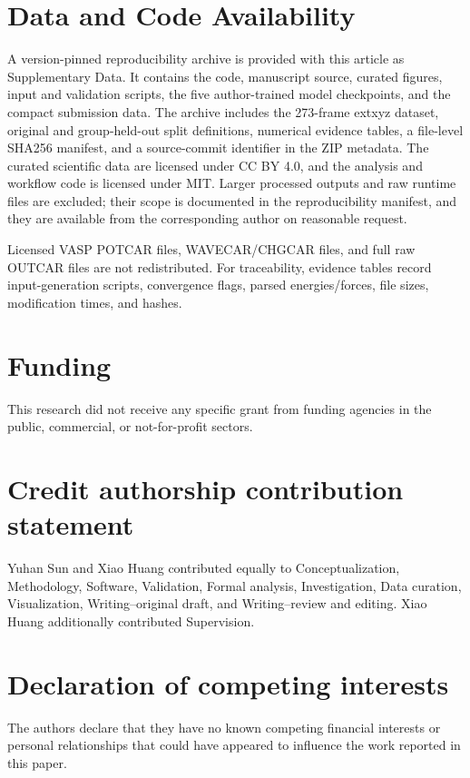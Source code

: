\documentclass[12pt]{article}
\begin{document}
\section*{Data and Code Availability}

A version-pinned reproducibility archive is provided with this article as
Supplementary Data. It contains the code, manuscript source, curated figures,
input and validation scripts, the five author-trained model checkpoints, and
the compact submission data. The archive includes the 273-frame extxyz dataset,
original and group-held-out split definitions, numerical evidence tables, a
file-level SHA256 manifest, and a source-commit identifier in the ZIP metadata.
The curated scientific data are licensed under CC BY 4.0, and the analysis and
workflow code is licensed under MIT. Larger processed outputs and raw runtime
files are excluded; their scope is documented in the reproducibility manifest,
and they are available from the corresponding author on reasonable request.

Licensed VASP POTCAR files, WAVECAR/CHGCAR files, and full raw OUTCAR files are not redistributed. For traceability, evidence tables record input-generation scripts, convergence flags, parsed energies/forces, file sizes, modification times, and hashes.

\section*{Funding}

This research did not receive any specific grant from funding agencies in the public, commercial, or not-for-profit sectors.

\section*{Credit authorship contribution statement}

Yuhan Sun and Xiao Huang contributed equally to Conceptualization, Methodology,
Software, Validation, Formal analysis, Investigation, Data curation,
Visualization, Writing--original draft, and Writing--review and editing.
Xiao Huang additionally contributed Supervision.

\section*{Declaration of competing interests}

The authors declare that they have no known competing financial interests or personal relationships that could have appeared to influence the work reported in this paper.
\end{document}
